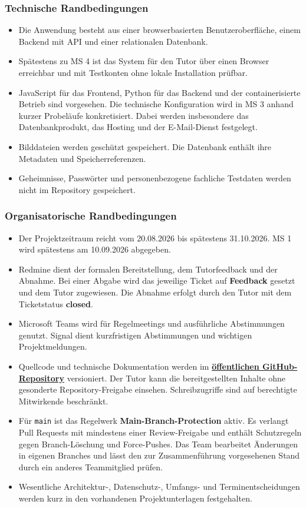 \documentclass[11pt,a4paper]{article}
\begin{document}
\subsubsection{Technische Randbedingungen}

\begin{itemize}
\item Die Anwendung besteht aus einer browserbasierten Benutzeroberfläche, einem Backend mit API und einer relationalen Datenbank.
\item Spätestens zu MS 4 ist das System für den Tutor über einen Browser erreichbar und mit Testkonten ohne lokale Installation prüfbar.
\item JavaScript für das Frontend, Python für das Backend und der containerisierte Betrieb sind vorgesehen. Die technische Konfiguration wird in MS 3 anhand kurzer Probeläufe konkretisiert. Dabei werden insbesondere das Datenbankprodukt, das Hosting und der E-Mail-Dienst festgelegt.
\item Bilddateien werden geschützt gespeichert. Die Datenbank enthält ihre Metadaten und Speicherreferenzen.
\item Geheimnisse, Passwörter und personenbezogene fachliche Testdaten werden nicht im \mbox{Repository} gespeichert.
\end{itemize}

\subsubsection{Organisatorische Randbedingungen}

\begin{itemize}
\item Der Projektzeitraum reicht vom 20.08.2026 bis spätestens 31.10.2026. MS 1 wird spätestens am 10.09.2026 abgegeben.
\item Redmine dient der formalen Bereitstellung, dem Tutorfeedback und der Abnahme. Bei einer Abgabe wird das jeweilige Ticket auf \textbf{Feedback} gesetzt und dem Tutor zugewiesen. Die Abnahme erfolgt durch den Tutor mit dem Ticketstatus \textbf{closed}.
\item Microsoft Teams wird für Regelmeetings und ausführliche Abstimmungen genutzt. Signal dient kurzfristigen Abstimmungen und wichtigen Projektmeldungen.
\item Quellcode und technische Dokumentation werden im \href{https://github.com/julianammann/isefgm}{\textbf{öffentlichen GitHub-Repository}} versioniert. Der Tutor kann die bereitgestellten Inhalte ohne gesonderte Repository-Freigabe einsehen. Schreibzugriffe sind auf berechtigte Mitwirkende beschränkt.
\item Für \texttt{main} ist das Regelwerk \textbf{Main-Branch-Protection} aktiv. Es verlangt Pull Requests mit mindestens einer Review-Freigabe und enthält Schutzregeln gegen Branch-Löschung und Force-Pushes. Das Team bearbeitet Änderungen in eigenen Branches und lässt den zur Zusammenführung vorgesehenen Stand durch ein anderes Teammitglied prüfen.
\item Wesentliche Architektur-, Datenschutz-, Umfangs- und Terminentscheidungen werden kurz in den vorhandenen Projektunterlagen festgehalten.
\end{itemize}
\end{document}
